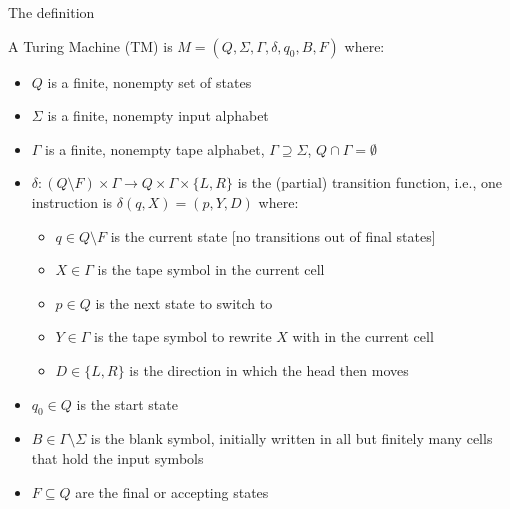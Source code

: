 \documentclass[handout]{beamer}
\begin{document}
\begin{frame}{The definition}

    A \alert{Turing Machine (TM)} is $M=(Q,\Sigma,\Gamma,\delta,q_0,B,F)$ where:
    
    \begin{itemize}
        \item $Q$ is a finite, nonempty set of \alert{states}
        \item $\Sigma$ is a finite, nonempty \alert{input alphabet} 
        \item $\Gamma$ is a finite, nonempty \alert{tape alphabet}, $\Gamma \supseteq \Sigma$, $Q\cap \Gamma=\emptyset$
        \item $\delta\colon(Q\setminus F)\times\Gamma\rightarrow Q\times \Gamma\times \{L,R\}$ is the (partial) \alert{transition function}, i.e., one instruction is $\delta(q,X)=(p,Y,D)$ where:
        \begin{itemize}
            \item $q\in Q\setminus F$ is the current state [no transitions out of final states]
            \item $X\in\Gamma$ is the tape symbol in the current cell
            \item $p\in Q$ is the next state to switch to
            \item $Y\in \Gamma$ is the tape symbol to rewrite $X$ with in the current cell
            \item $D\in \{L,R\}$ is the \alert{direction} in which the head then moves
        \end{itemize}
        \item $q_0\in Q$ is the \alert{start state}
        \item $B\in\Gamma\setminus\Sigma$ is the \alert{blank symbol}, initially written in all but finitely many cells that hold the input symbols
        \item $F\subseteq Q$ are the \alert{final} or \alert{accepting} states
    \end{itemize}

\end{frame}
\end{document}
